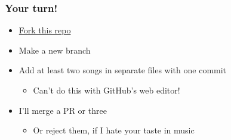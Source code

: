 \documentclass[glossy]{beamer}
\begin{document}
\begin{frame}[fragile=singleslide]
  \frametitle{Your turn!}

  \begin{itemize}
    \item \href{https://github.com/JesseTG/taciturn-octo-woof}{Fork this repo}
    \item Make a new branch
    \item Add at least two songs in separate files with one commit
    \begin{itemize}
      \item Can't do this with GitHub's web editor!
    \end{itemize}
    \item I'll merge a PR or three
    \begin{itemize}
      \item Or reject them, if I hate your taste in music
    \end{itemize}
  \end{itemize}
\end{frame}
\end{document}

